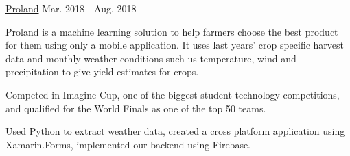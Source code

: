 \begin{cventries}
  \project
    {\href{http://prolandfarming.com}{Proland}} %
    {Mar. 2018 - Aug. 2018} %
    {
      \begin{cvitems}
        \item {Proland is a machine learning solution to help farmers choose the best product for them using only a mobile application. It uses last years' crop specific harvest data and monthly weather conditions such us temperature, wind and precipitation to give yield estimates for crops.}
        \item {Competed in Imagine Cup, one of the biggest student technology competitions, and qualified for the World Finals as one of the top 50 teams.}
        \item {Used Python to extract weather data, created a cross platform application using Xamarin.Forms, implemented our backend using Firebase.}
      \end{cvitems}
    }
\end{cventries}

